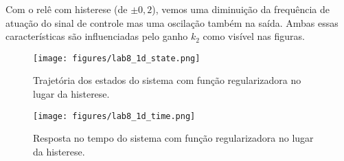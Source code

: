 \documentclass[a4paper]{report}
\begin{document}
Com o relê com histerese (de $\pm 0,2$), vemos uma diminuição da frequência de atuação do sinal de controle mas uma oscilação também na saída. Ambas essas características são influenciadas pelo ganho $k_2$ como visível nas figuras.


\begin{figure}[H]
    \centering
    \texttt{[image: figures/lab8\_1d\_state.png]}
    \caption{Trajetória dos estados do sistema com função regularizadora no lugar da histerese.}
    \label{fig:figures-lab8_1d_state-png}
\end{figure}

\begin{figure}[H]
    \centering
    \texttt{[image: figures/lab8\_1d\_time.png]}
    \caption{Resposta no tempo do sistema com função regularizadora no lugar da histerese.}
    \label{fig:figures-lab8_1d_state-png}
\end{figure}
\end{document}
